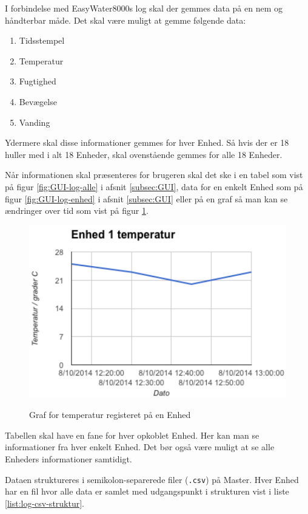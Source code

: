
I forbindelse med EasyWater8000s log skal der gemmes data på en nem og håndterbar måde. Det skal være muligt at gemme følgende data:

\begin{enumerate}
	\item Tidsstempel
	\item Temperatur
	\item Fugtighed
	\item Bevægelse
	\item Vanding
\end{enumerate}

Ydermere skal disse informationer gemmes for hver Enhed. Så hvis der er 18 huller med i alt 18 Enheder, skal ovenstående gemmes for alle 18 Enheder.

Når informationen skal præsenteres for brugeren skal det ske i en tabel som vist på figur \ref{fig:GUI-log-alle} i afsnit \ref{subsec:GUI}, data for en enkelt Enhed som på figur \ref{fig:GUI-log-enhed} i afsnit \ref{subsec:GUI} eller på en graf så man kan se ændringer over tid som vist på figur \ref{fig:log-graf}.

\begin{figure}[htbp] \centering
{\includegraphics[scale=0.5]{filer/pics/SW-Log-graf}}
\caption{Graf for temperatur registeret på en Enhed}
\label{fig:log-graf}
\end{figure}

Tabellen skal have en fane for hver opkoblet Enhed. Her kan man se informationer fra hver enkelt Enhed. Det bør også være muligt at se alle Enheders informationer samtidigt.

Dataen struktureres i semikolon-separerede filer (\verb+.csv+) på Master. Hver Enhed har en fil hvor alle data er samlet med udgangspunkt i strukturen vist i liste \ref{list:log-csv-struktur}.

